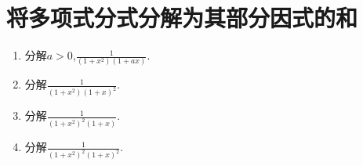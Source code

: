 \documentclass[../../main.tex]{subfiles}
\begin{document}
\section{将多项式分式分解为其部分因式的和}

\begin{example}
\begin{enumerate}
\item 分解\(a > 0\),\(\frac{1}{(1 + x^2)(1 + ax)}\).

\item 分解\(\frac{1}{(1 + x^2)(1 + x)^2}\).

\item 分解\(\frac{1}{(1 + x^2)^2(1 + x)}\).

\item 分解\(\frac{1}{(1 + x^2)^2(1 + x)^2}\).
\end{enumerate}
\end{example}
\end{document}
